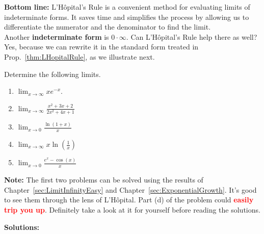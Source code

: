 \Qed


\textbf{Bottom line:} L'H\^opital's Rule is a convenient method for evaluating limits of indeterminate forms. It saves time and simplifies the process by allowing us to differentiate the numerator and the denominator to find the limit. \\

Another \textbf{indeterminate form } is $0 \cdot \infty$. Can  L'H\^opital's Rule help there as well? Yes, because we can rewrite it in the standard form treated in Prop.~\ref{thm:LHopitalRule}, as we illustrate next.

\vspace*{.2cm}

\begin{example} Determine the following limits.

\begin{enumerate}
\renewcommand{\labelenumi}{(\alph{enumi})}
\setlength{\itemsep}{.2cm}

    \item $\displaystyle \lim_{{x \to \infty}} x e^{-x}$.
   
    
    \item $\displaystyle \lim_{{x \to \infty}} \frac{x^2 + 3x + 2}{2x^2 + 4x + 1}$


    \item $\displaystyle \lim_{{x \to 0}} \frac{\ln(1+x)}{x}$

    \item $\displaystyle \lim_{{x \to \infty}} x \ln\left(\frac{1}{x}\right)$


\item $\displaystyle \lim_{{x \to 0}} \frac{e^x - \cos(x)}{x}$

\end{enumerate}   

\textbf{Note:} The first two problems can be solved using the results of Chapter~\ref{sec:LimitInfinityEasy} and Chapter~\ref{sec:ExponentialGrowth}. It's good to see them through the lens of L'H\^opital. Part (d) of the problem could \textcolor{red}{\bf easily trip you up}. Definitely take a look at it for yourself before reading the solutions.
    
\end{example}

\textbf{Solutions:}

